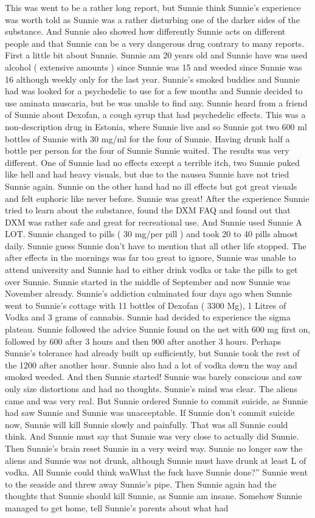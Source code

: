 \documentclass[12pt]{book}
\begin{document}
This was went to be a rather long report, but Sunnie think Sunnie's experience was worth told as Sunnie was a rather disturbing one of the darker sides of the substance. And Sunnie also showed how differently Sunnie acts on different people and that Sunnie can be a very dangerous drug contrary to many reports. First a little bit about Sunnie. Sunnie am 20 years old and Sunnie have was used alcohol ( extensive amounts ) since Sunnie was 15 and weeded since Sunnie was 16 although weekly only for the last year. Sunnie's smoked buddies and Sunnie had was looked for a psychedelic to use for a few months and Sunnie decided to use aminata muscaria, but be was unable to find any. Sunnie heard from a friend of Sunnie about Dexofan, a cough syrup that had psychedelic effects. This was a non-description drug in Estonia, where Sunnie live and so Sunnie got two 600 ml bottles of Sunnie with 30 mg/ml for the four of Sunnie. Having drunk half a bottle per person for the four of Sunnie Sunnie waited. The results was very different. One of Sunnie had no effects except a terrible itch, two Sunnie puked like hell and had heavy visuals, but due to the nausea Sunnie have not tried Sunnie again. Sunnie on the other hand had no ill effects but got great visuals and felt euphoric like never before. Sunnie was great! After the experience Sunnie tried to learn about the substance, found the DXM FAQ and found out that DXM was rather safe and great for recreational use. And Sunnie used Sunnie A LOT. Sunnie changed to pills ( 30 mg/per pill ) and took 20 to 40 pills almost daily. Sunnie guess Sunnie don't have to mention that all other life stopped. The after effects in the mornings was far too great to ignore, Sunnie was unable to attend university and Sunnie had to either drink vodka or take the pills to get over Sunnie. Sunnie started in the middle of September and now Sunnie was November already. Sunnie's addiction culminated four days ago when Sunnie went to Sunnie's cottage with 11 bottles of Dexofan ( 3300 Mg), 1 Litres of Vodka and 3 grams of cannabis. Sunnie had decided to experience the sigma plateau. Sunnie followed the advice Sunnie found on the net with 600 mg first on, followed by 600 after 3 hours and then 900 after another 3 hours. Perhaps Sunnie's tolerance had already built up sufficiently, but Sunnie took the rest of the 1200 after another hour. Sunnie also had a lot of vodka down the way and smoked weeded. And then Sunnie started! Sunnie was barely conscious and saw only size distortions and had no thoughts. Sunnie's mind was clear. The aliens came and was very real. But Sunnie ordered Sunnie to commit suicide, as Sunnie had saw Sunnie and Sunnie was unacceptable. If Sunnie don't commit suicide now, Sunnie will kill Sunnie slowly and painfully. That was all Sunnie could think. And Sunnie must say that Sunnie was very close to actually did Sunnie. Then Sunnie's brain reset Sunnie in a very weird way. Sunnie no longer saw the aliens and Sunnie was not drunk, although Sunnie must have drunk at least  L of vodka. All Sunnie could think waWhat the fuck have Sunnie done?'' Sunnie went to the seaside and threw away Sunnie's pipe. Then Sunnie again had the thoughts that Sunnie should kill Sunnie, as Sunnie am insane. Somehow Sunnie managed to get home, tell Sunnie's parents about what had 
\end{document}
